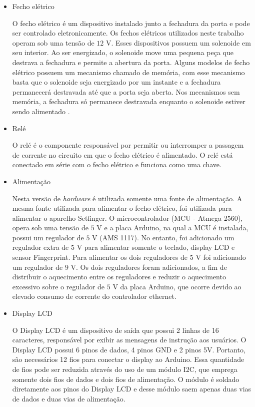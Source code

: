 \begin{itemize}
    
    \item Fecho elétrico
    
    O fecho elétrico é um dispositivo instalado junto a fechadura da porta e pode ser controlado eletronicamente. Os fechos elétricos utilizados neste trabalho operam sob uma tensão de $12$ V. Esses dispositivos possuem um solenoide em seu interior. Ao ser energizado, o solenoide move uma pequena peça que destrava a fechadura e permite a abertura da porta. Alguns modelos de fecho elétrico possuem um mecanismo chamado de memória, com esse mecanismo basta que o solenoide seja energizado por um instante e a fechadura permanecerá destravada até que a porta seja aberta. Nos mecanismos sem memória, a fechadura só permanece destravada enquanto o solenoide estiver sendo alimentado \cite{tobias2015illustrated, norman2011electronic}.   
    
    \item Relé
    
    O relé é o componente responsável por permitir ou interromper a passagem de corrente no circuito em que o fecho elétrico é alimentado. O relé está conectado em série com o fecho elétrico e funciona como uma chave.
    
    \item Alimentação
    
    Nesta versão de \textit{hardware} é utilizada somente uma fonte de alimentação. A mesma fonte utilizada para alimentar o fecho elétrico, foi utilizada para alimentar o aparelho Setfinger. O microcontrolador (MCU - Atmega 2560), opera sob uma tensão de $5$ V e a placa Arduino, na qual a MCU é instalada, possui um regulador de $5$ V (AMS 1117). No entanto, foi adicionado um regulador extra de $5$ V para alimentar somente o teclado, display LCD e sensor Fingerprint. Para alimentar os dois reguladores de $5$ V foi adicionado um regulador de $9$ V. Os dois reguladores foram adicionados, a fim de distribuir o aquecimento entre os reguladores e reduzir o aquecimento excessivo sobre o regulador de $5$ V da placa Arduino, que ocorre devido ao elevado consumo de corrente do controlador ethernet.  
    
    \item Display LCD
    
    O Display LCD é um dispositivo de saída que possui 2 linhas de 16 caracteres, responsável por exibir as mensagens de instrução aos usuários. O Display LCD possui 6 pinos de dados, 4 pinos GND e 2 
    pinos 5V. Portanto, são necessários 12 fios para conectar o display ao Arduino. Essa quantidade de fios pode ser reduzida através do uso de um módulo I2C, que emprega somente dois fios de dados e dois fios de alimentação. O módulo é soldado diretamente aos pinos do Display LCD e desse módulo saem apenas duas vias de dados e duas vias de alimentação. 


\end{itemize}
